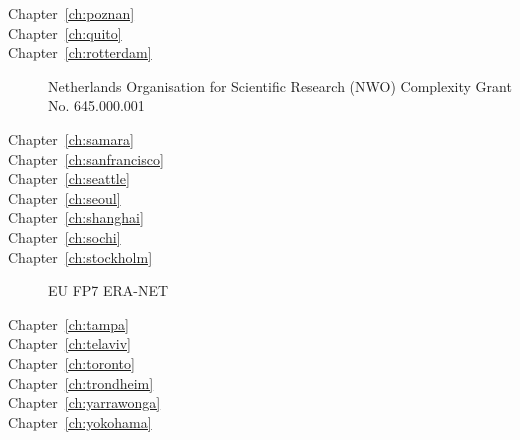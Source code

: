 \begin{description}
\item[Chapter~\ref{ch:poznan}]  

\item[Chapter~\ref{ch:quito}]  

\item[Chapter~\ref{ch:rotterdam}]  Netherlands Organisation for Scientific Research (NWO) Complexity Grant No. 645.000.001

\item[Chapter~\ref{ch:samara}]  

\item[Chapter~\ref{ch:sanfrancisco}]  

\item[Chapter~\ref{ch:seattle}]  

\item[Chapter~\ref{ch:seoul}]  

\item[Chapter~\ref{ch:shanghai}]  

\item[Chapter~\ref{ch:sochi}]  

\item[Chapter~\ref{ch:stockholm}]  EU FP7 ERA-NET 

\item[Chapter~\ref{ch:tampa}]  

\item[Chapter~\ref{ch:telaviv}]  

\item[Chapter~\ref{ch:toronto}]  

\item[Chapter~\ref{ch:trondheim}]  

\item[Chapter~\ref{ch:yarrawonga}]  

\item[Chapter~\ref{ch:yokohama}]  
%
%
\end{description}

